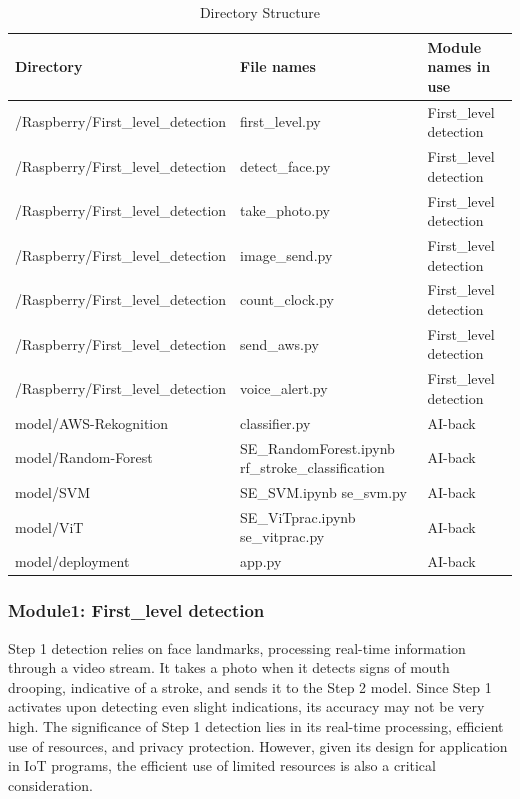 \begin{table}[H]
\caption{Directory Structure}
\begin{tabular}{|p{4cm}|p{2.5cm}|p{1cm}|}
\hline
Directory & File names & Module names in use \\ \hline
/Raspberry/First\_level\_detection & first\_level.py & First\_level detection \\ \hline
/Raspberry/First\_level\_detection & detect\_face.py & First\_level detection\\ \hline
/Raspberry/First\_level\_detection & take\_photo.py & First\_level detection\\ \hline
/Raspberry/First\_level\_detection & image\_send.py & First\_level detection\\ \hline
/Raspberry/First\_level\_detection & count\_clock.py & First\_level detection\\ \hline
/Raspberry/First\_level\_detection & send\_aws.py & First\_level detection\\ \hline
/Raspberry/First\_level\_detection & voice\_alert.py & First\_level detection\\ \hline
model/AWS-Rekognition   &    classifier.py        &      AI-back  \\ \hline
model/Random-Forest   &  SE\_RandomForest.ipynb rf\_stroke\_classification       &   AI-back   \\ \hline
model/SVM   &     SE\_SVM.ipynb se\_svm.py      &          AI-back        \\ \hline
model/ViT   &      SE\_ViTprac.ipynb \newline se\_vitprac.py     &          AI-back \\ \hline
model/deployment & app.py & AI-back \\ \hline
\end{tabular}
\end{table}

\subsubsection{Module1: First\_level detection}
Step 1 detection relies on face landmarks, processing real-time information through a video stream. It takes a photo when it detects signs of mouth drooping, indicative of a stroke, and sends it to the Step 2 model. Since Step 1 activates upon detecting even slight indications, its accuracy may not be very high. The significance of Step 1 detection lies in its real-time processing, efficient use of resources, and privacy protection. However, given its design for application in IoT programs, the efficient use of limited resources is also a critical consideration.\\


